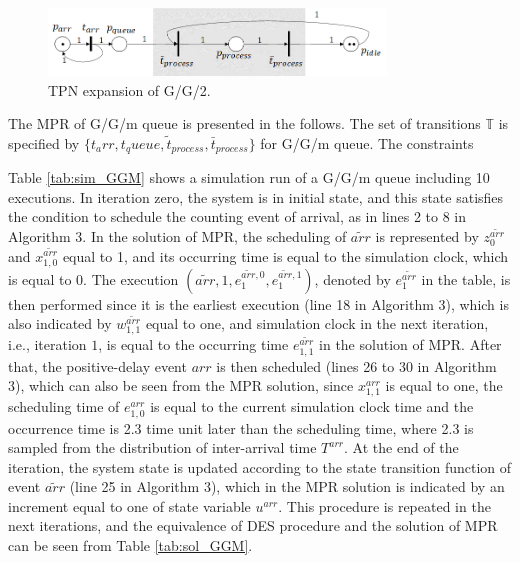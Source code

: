 \documentclass[suppldata]{interact}
\theoremstyle{plain}
\theoremstyle{definition}
\theoremstyle{remark}
\begin{document}
\begin{figure}[h]
	\centering
	\includegraphics[width=0.8\textwidth]{Figures/TPN-GG2-expansion.png}
	\caption{TPN expansion of G/G/2.}
	\label{fig:tpn_GG2_expansion}
\end{figure}

The MPR of G/G/m queue is presented in the follows. The set of transitions $\mathbb{T}$ is specified by $\{t_arr, t_queue,\tilde{t}_{process}, \bar{t}_{process}\}$ for G/G/m queue. The constraints 


Table \ref{tab:sim_GGM} shows a simulation run of a G/G/m queue including 10 executions. In iteration zero, the system is in initial state, and this state satisfies the condition to schedule the counting event of arrival, as in lines 2 to 8 in Algorithm 3. In the solution of MPR, the scheduling of $\tilde{arr}$ is represented by $z^{\tilde{arr}}_0$ and $x^{\tilde{arr}}_{1,0}$ equal to 1, and its occurring time is equal to the simulation clock, which is equal to 0. The execution $(\tilde{arr}, 1, e^{\tilde{arr},0}_1, e^{\tilde{arr},1}_1)$, denoted by $e^{\tilde{arr}}_1$ in the table, is then performed since it is the earliest execution (line 18 in Algorithm 3), which is also indicated by $w^{\tilde{arr}}_{1,1}$ equal to one, and simulation clock in the next iteration, i.e., iteration $1$, is equal to the occurring time $e^{\tilde{arr}}_{1,1}$ in the solution of MPR. After that, the positive-delay event $arr$ is then scheduled (lines 26 to 30 in Algorithm 3), which can also be seen from the MPR solution, since $x^{arr}_{1,1}$ is equal to one, the scheduling time of $e^{arr}_{1,0}$ is equal to the current simulation clock time and the occurrence time is 2.3 time unit later than the scheduling time, where 2.3 is sampled from the distribution of inter-arrival time $T^{arr}$. At the end of the iteration, the system state is updated according to the state transition function of event $\tilde{arr}$ (line 25 in Algorithm 3), which in the MPR solution is indicated by an increment equal to one of state variable $u^{arr}$. This procedure is repeated in the next iterations, and the equivalence of DES procedure and the solution of MPR can be seen from Table \ref{tab:sol_GGM}. 
\end{document}
